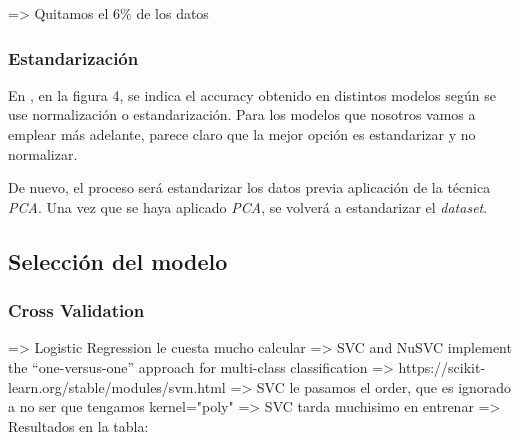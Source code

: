 \documentclass[11pt]{article}
\begin{document}
=> Quitamos el 6\% de los datos

\subsubsection{Estandarización}

En \cite{paper_clasificacion_1:paper}, en la figura 4, se indica el accuracy obtenido en distintos modelos según se use normalización o estandarización. Para los modelos que nosotros vamos a emplear más adelante, parece claro que la mejor opción es estandarizar y no normalizar.

De nuevo, el proceso será estandarizar los datos previa aplicación de la técnica \emph{PCA}. Una vez que se haya aplicado \emph{PCA}, se volverá a estandarizar el \emph{dataset}.

\subsection{Selección del modelo}
\subsubsection{Cross Validation}


=> Logistic Regression le cuesta mucho calcular
=> SVC and NuSVC implement the “one-versus-one” approach for multi-class classification => https://scikit-learn.org/stable/modules/svm.html
=> SVC le pasamos el order, que es ignorado a no ser que tengamos kernel="poly"
=> SVC tarda muchisimo en entrenar
=> Resultados en la tabla:
\end{document}
